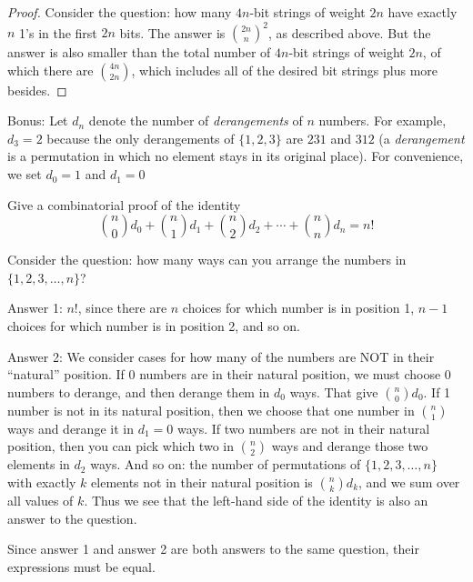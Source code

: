 \documentclass[11pt]{exam}
\begin{document}
\begin{questions}
\begin{parts}
\begin{solution}
		\begin{proof}
			Consider the question: how many $4n$-bit strings of weight $2n$ have exactly $n$ 1's in the first $2n$ bits.  The answer is $\binom{2n}{n}^2$, as described above.  But the answer is also smaller than the total number of $4n$-bit strings of weight $2n$, of which there are $\binom{4n}{2n}$, which includes all of the desired bit strings plus more besides.
		\end{proof}
	\end{solution}
\end{parts}



\bonusquestion[10] Bonus: Let $d_n$ denote the number of \emph{derangements} of $n$ numbers.  For example, $d_3 = 2$ because the only derangements of $\{1,2,3\}$ are $231$ and $312$ (a \emph{derangement} is a permutation in which no element stays in its original place).  For convenience, we set $d_0 = 1$ and $d_1 = 0$

Give a combinatorial proof of the identity
\[\binom{n}{0} d_0 + \binom{n}{1}d_1 + \binom{n}{2}d_2 + \cdots + \binom{n}{n}d_n = n!\]

\begin{solution}
	Consider the question: how many ways can you arrange the numbers in $\{1,2,3,\ldots, n\}$?

	Answer 1: $n!$, since there are $n$ choices for which number is in position 1, $n-1$ choices for which number is in position 2, and so on.

	Answer 2: We consider cases for how many of the numbers are NOT in their ``natural'' position.  If 0 numbers are in their natural position, we must choose 0 numbers to derange, and then derange them in $d_0$ ways.  That give $\binom{n}{0}d_0$.  If 1 number is not in its natural position, then we choose that one number in $\binom{n}{1}$ ways and derange it in $d_1 = 0$ ways.  If two numbers are not in their natural position, then you can pick which two in $\binom{n}{2}$ ways and derange those two elements in $d_2$ ways.  And so on: the number of permutations of $\{1,2,3,\ldots, n\}$ with exactly $k$ elements not in their natural position is $\binom{n}{k}d_k$, and we sum over all values of $k$.  Thus we see that the left-hand side of the identity is also an answer to the question.

	Since answer 1 and answer 2 are both answers to the same question, their expressions must be equal.
\end{solution}

\end{questions}
\end{document}
